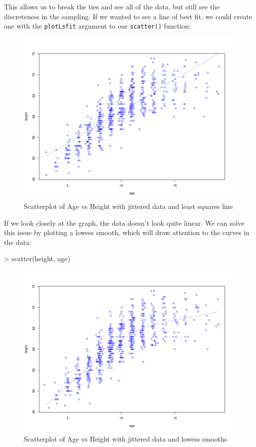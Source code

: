 \documentclass[landscape]{article}
\renewenvironment{Schunk}{\vspace{\topsep}}{\vspace{\topsep}}
\begin{document}
This allows us to break the ties and see all of the data, but still see the discreteness in the sampling. If we wanted to see a line of best fit, we could create one with the \texttt{plotLsfit} argument to our \texttt{scatter()} function:\\
\begin{figure}[h]
\centering
\includegraphics[scale=.005]{fevdoc-scatter3}
\caption{Scatterplot of Age vs Height with jittered data and least squares line}
\label{scatter3}
\end{figure}
If we look closely at the graph, the data doesn't look quite linear. We can solve this issue by plotting a lowess smooth, which will draw attention to the curves in the data:\\
\begin{Schunk}
\begin{Sinput}
> scatter(height, age)
\end{Sinput}
\end{Schunk}
\begin{figure}[h]
\centering
\includegraphics[scale=.005]{fevdoc-scatter4}
\caption{Scatterplot of Age vs Height with jittered data and lowess smooths}
\label{scatter4}
\end{figure}
\clearpage
\end{document}
